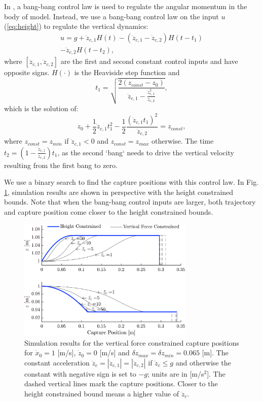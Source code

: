 \documentclass[letterpaper, 10 pt, conference]{ieeeconf}  %
\newcommand{\zmin}{z_{min}}
\newcommand{\zmax}{z_{max}}
\newcommand{\ddzcf}{\ddot{z}_{c,1}}
\newcommand{\ddzcs}{\ddot{z}_{c,2}}
\begin{document}
In \cite{pratt2006capture,stephens2007humanoid,koolen2012capturability}, a bang-bang control law is used to regulate the angular momentum in the body of model. Instead, we use a bang-bang control law on the input $u$ (\ref{eq:height}) to regulate the vertical dynamics:
\begin{multline}
	u = g + \ddot{z}_{c,1}H(t) - (\ddot{z}_{c,1} - \ddot{z}_{c,2})H(t-t_1) \\ - \ddot{z}_{c,2}H(t-t_2),
\end{multline}
where $[\ddzcf,\ddzcs]$ are the first and second constant control inputs and have opposite signs. $H(\cdot)$ is the Heaviside step function and 
\begin{equation}
t_1=\sqrt{\frac{2(z_{const}-z_0)}{\ddzcf - \frac{\ddzcf^2}{\ddzcs}}},
\end{equation}
which is the solution of:
\begin{equation}
	z_0+\frac{1}{2}\ddzcf t_1^2 - \frac{1}{2}\frac{(\ddzcf t_1)^2}{\ddzcs}= z_{const},
\end{equation}
where $z_{const}=\zmin$ if $\ddzcf <0$ and $z_{const}=\zmax$ otherwise. The time $t_2=(1-\frac{\ddzcf}{\ddzcs})t_1$, as the second `bang` needs to drive the vertical velocity resulting from the first bang to zero. 

We use a binary search to find the capture positions with this control law. In Fig. \ref{fig:zvsf}, simulation results are shown in perspective with the height constrained bounds. Note that when the bang-bang control inputs are larger, both trajectory and capture position come closer to the height constrained bounds.
\begin{figure}
      \centering
      \includegraphics[width=3.3in]{heightvsforcelim2.png}
      \caption{Simulation results for the vertical force constrained capture positions for $\dot{x}_0=1$ [m/s], $\dot{z}_0=0$ [m/s] and $\delta \zmax=\delta \zmin=0.065$ [m]. The constant acceleration $\ddot{z}_c=|\ddzcf|=|\ddzcs|$ if $\ddot{z}_c \leq g$ and otherwise the constant with negative sign is set to $-g$; units are in [m/s$^2$]. The dashed vertical lines mark the capture positions. Closer to the height constrained bound means a higher value of $\ddot{z}_c$.}
      \label{fig:zvsf}
\end{figure}
\end{document}
